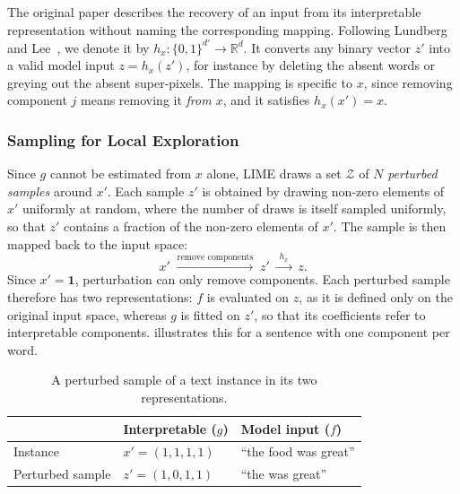     The original paper describes the recovery of an input from its interpretable representation without naming the corresponding mapping. Following Lundberg and Lee~\cite{NIPS2017_8a20a862}, we denote it by $h_x : \{0,1\}^{d'} \to \mathbb{R}^d$. It converts any binary vector $z'$ into a valid model input $z = h_x(z')$, for instance by deleting the absent words or greying out the absent super-pixels. The mapping is specific to $x$, since removing component $j$ means removing it \textit{from $x$}, and it satisfies $h_x(x') = x$.

    \subsubsection{Sampling for Local Exploration}
    Since $g$ cannot be estimated from $x$ alone, LIME draws a set $\mathcal{Z}$ of $N$ \textit{perturbed samples} around $x'$. Each sample $z'$ is obtained by drawing non-zero elements of $x'$ uniformly at random, where the number of draws is itself sampled uniformly, so that $z'$ contains a fraction of the non-zero elements of $x'$. The sample is then mapped back to the input space:
    \begin{equation}
        x' \;\xrightarrow{\text{remove components}}\; z' \;\xrightarrow{\;h_x\;}\; z .
    \end{equation}
    Since $x' = \mathbf{1}$, perturbation can only remove components. Each perturbed sample therefore has two representations: $f$ is evaluated on $z$, as it is defined only on the original input space, whereas $g$ is fitted on $z'$, so that its coefficients refer to interpretable components.  illustrates this for a sentence with one component per word.

    \begin{table}[htbp]
        \centering
        \footnotesize
        \caption{A perturbed sample of a text instance in its two representations.}
        \label{tab:lime-variation}
        \begin{tabular}{@{}lll@{}}
            \toprule
            & Interpretable ($g$) & Model input ($f$) \\
            \midrule
            Instance & $x' = (1,1,1,1)$ & ``the food was great'' \\
            Perturbed sample & $z' = (1,0,1,1)$ & ``the was great'' \\
            \bottomrule
        \end{tabular}
    \end{table}

